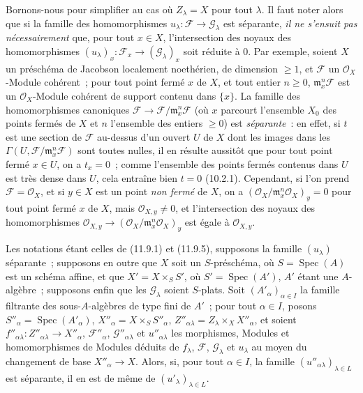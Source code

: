\begin{remark}[11.9.11]
\label{IV.11.9.11-fr}
Bornons-nous pour simplifier au cas où $Z_\lambda=X$ pour tout $\lambda$. Il
faut noter alors que si la famille des homomorphismes
$u_\lambda:\mathcal F\to\mathcal G_\lambda$ est séparante, \emph{il ne
s'ensuit pas nécessairement} que, pour tout $x\in X$, l'intersection des
noyaux des homomorphismes
$(u_\lambda)_x:\mathcal F_x\to(\mathcal G_\lambda)_x$ soit réduite à 0. Par
exemple, soient $X$ un préschéma de Jacobson localement noethérien, de
dimension $\geq1$, et $\mathcal F$ un $\mathcal O_X$-Module cohérent~; pour
tout point fermé $x$ de $X$, et tout entier $n\geq0$,
$\mathfrak m_x^n\mathcal F$ est un $\mathcal O_X$-Module cohérent de support
contenu dans $\{x\}$. La famille des homomorphismes canoniques
$\mathcal F\to\mathcal F/\mathfrak m_x^n\mathcal F$ (où $x$ parcourt
l'ensemble $X_0$ des points fermés de $X$ et $n$ l'ensemble des entiers
$\geq0$) est \emph{séparante}~: en effet, si $t$ est une section de
$\mathcal F$ au-dessus d'un ouvert $U$ de $X$ dont les images dans les
$\Gamma(U,\mathcal F/\mathfrak m_x^n\mathcal F)$ sont toutes nulles, il en
résulte aussitôt que pour tout point fermé $x\in U$, on a $t_x=0$~; comme
l'ensemble des points fermés contenus dans $U$ est très dense dans $U$, cela
entraîne bien $t=0$ (10.2.1). Cependant, si l'on prend
$\mathcal F=\mathcal O_X$, et si $y\in X$ est un point \emph{non fermé} de
$X$, on a $(\mathcal O_X/\mathfrak m_x^n\mathcal O_X)_y=0$ pour tout point
fermé $x$ de $X$, mais $\mathcal O_{X,y}\neq0$, et l'intersection des noyaux
des homomorphismes
$\mathcal O_{X,y}\to(\mathcal O_X/\mathfrak m_x^n\mathcal O_X)_y$ est égale
à $\mathcal O_{X,y}$.
\end{remark}

\begin{lemma}[11.9.12]
\label{IV.11.9.12-fr}
Les notations étant celles de (11.9.1) et (11.9.5), supposons la famille
$(u_\lambda)$ séparante~; supposons en outre que $X$ soit un $S$-préschéma, où
$S=\operatorname{Spec}(A)$ est un schéma affine, et que
$X'=X\times_S S'$, où $S'=\operatorname{Spec}(A')$, $A'$ étant une
$A$-algèbre~; supposons enfin que les $\mathcal G_\lambda$ soient $S$-plats.
Soit $(A'_\alpha)_{\alpha\in I}$ la famille filtrante des sous-$A$-algèbres de
type fini de $A'$~; pour tout $\alpha\in I$, posons
$S''_\alpha=\operatorname{Spec}(A'_\alpha)$,
$X''_\alpha=X\times_S S''_\alpha$,
$Z''_{\alpha\lambda}=Z_\lambda\times_X X''_\alpha$, et soient
$f''_{\alpha\lambda}:Z''_{\alpha\lambda}\to X''_\alpha$,
$\mathcal F''_\alpha$, $\mathcal G''_{\alpha\lambda}$ et
$u''_{\alpha\lambda}$ les morphismes, Modules et homomorphismes de Modules
déduits de $f_\lambda$, $\mathcal F$, $\mathcal G_\lambda$ et $u_\lambda$ au
moyen du changement de base $X''_\alpha\to X$. Alors, si, pour tout
$\alpha\in I$, la famille $(u''_{\alpha\lambda})_{\lambda\in L}$ est
séparante, il en est de même de $(u'_\lambda)_{\lambda\in L}$.
\end{lemma}

